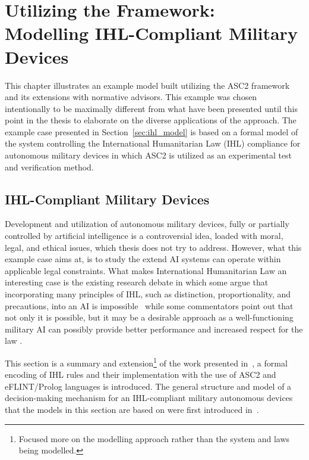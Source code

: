 \chapter{Utilizing the Framework: Modelling IHL-Compliant Military Devices}

This chapter illustrates an example model built utilizing the ASC2 framework and its extensions with normative advisors. This example was chosen intentionally to be maximally different from what have been presented until this point in the thesis to elaborate on the diverse applications of the approach. The example case presented in Section~\ref{sec:ihl_model} is based on a formal model of the system controlling the International Humanitarian Law (IHL) compliance for autonomous military devices in which ASC2 is utilized as an experimental test and verification method.%


\section{IHL-Compliant Military Devices}
Development and utilization of autonomous military devices, fully or partially controlled by artificial intelligence is a controversial idea, loaded with moral, legal, and ethical issues, which thesis does not try to address. However, what this example case aims at, is to study the extend AI systems can operate within applicable legal constraints. What makes International Humanitarian Law an interesting case is the existing research debate in which some argue that incorporating many principles of IHL, such as distinction, proportionality, and precautions, into an AI is impossible~\cite{115CrootofRcrdz,120Szpak} while some commentators point out that not only it is possible, but it may be a desirable approach as a well-functioning military AI can possibly provide better performance and increased respect for the law \cite{119DoDaiprinc,119NeyPCIslKeynt}.

This section is a summary and extension\footnote{Focused more on the modelling approach rather than the system and laws being modelled.} of the work presented in~\cite{zurek2022jurix}, a formal encoding of IHL rules and their implementation with the use of ASC2 and eFLINT/Prolog languages is introduced. The general structure and model of a decision-making mechanism for an IHL-compliant military autonomous devices that the models in this section are based on were first introduced in~\cite{zurek-coine22}.

